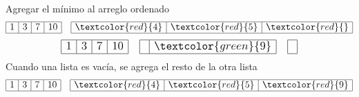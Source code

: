 \documentclass{article}
\begin{document}
\begin{minipage}{0.5\textwidth}
\begin{equation*}
  \end{equation*}
  Agregar el mínimo al arreglo ordenado
  \begin{equation*}
    \large
    \begin{array}{|r|r|r|r|}
      \hline 1 & 3 & 7 & 10 \\ \hline
    \end{array}\quad 
    \begin{array}{|r|r|r|}
      \hline \textcolor{red}{4} & \textcolor{red}{5} & \textcolor{red}{} \\ \hline
    \end{array}
  \end{equation*}
  \begin{equation*}
    \large
    \begin{array}{|r|r|r|r|}
      \hline 1 & 3 & 7 & 10 \\ \hline
    \end{array}\quad 
    \begin{array}{|r|r|}
      \hline & \textcolor{green}{9} \\ \hline
    \end{array} \quad
    \begin{array}{|r|}
      \hline \\ \hline
    \end{array}
  \end{equation*}
  Cuando una lista es vacía, se agrega el resto de la otra lista
  \begin{equation*}
    \large
    \begin{array}{|r|r|r|r|}
      \hline 1 & 3 & 7 & 10 \\ \hline
    \end{array}\quad 
    \begin{array}{|r|r|r|}
      \hline \textcolor{red}{4} & \textcolor{red}{5} & \textcolor{red}{9} \\ \hline
    \end{array}
  \end{equation*}
\end{minipage}
\end{document}
